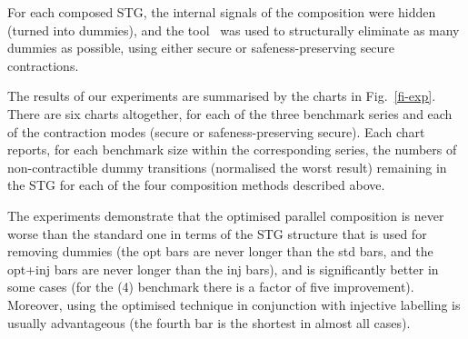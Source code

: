 For each composed STG, the internal signals of the composition
were hidden (\ie turned into dummies), and the \desij
tool~\cite{DesiJ} was used to structurally eliminate as many
dummies as possible, using either secure or safeness-preserving
secure contractions.

The results of our experiments are summarised by the charts in
Fig.~\ref{fi-exp}. There are six charts altogether, for each of
the three benchmark series and each of the contraction modes
(secure or safeness-preserving secure). Each chart reports, for
each benchmark size within the corresponding series, the
numbers of non-con\-trac\-tible dummy transitions (normalised
\wrt the worst result) remaining in the STG for each of the
four composition methods described above.

The experiments demonstrate that the optimised parallel
composition is never worse than the standard one in terms of
the STG structure that is used for removing dummies (the opt
bars are never longer than the std bars, and the opt+inj bars
are never longer than the inj bars), and is significantly
better in some cases (\eg for the \SeqCallParSync(4) benchmark
there is a factor of five improvement). Moreover, using the
optimised technique in conjunction with injective labelling is
usually advantageous (the fourth bar is the shortest in almost
all cases).
